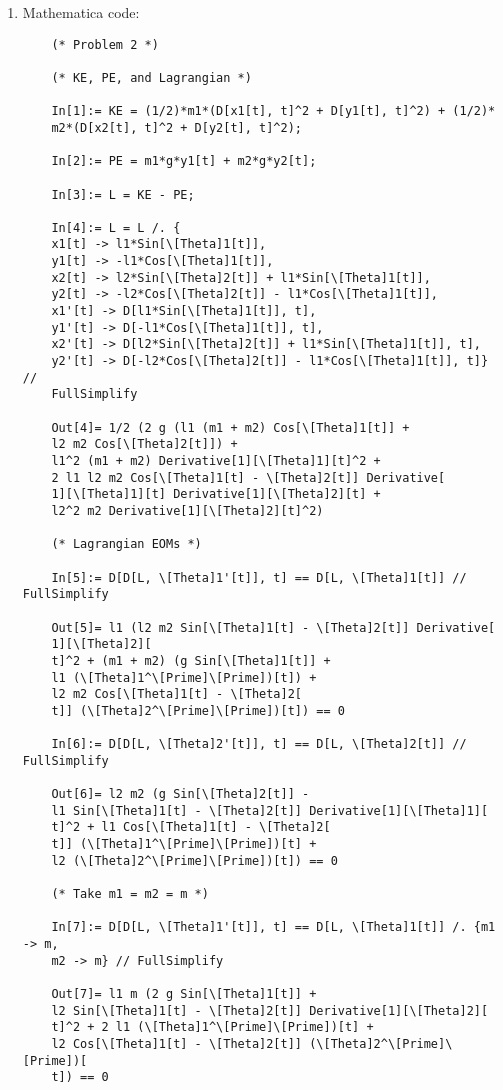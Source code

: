 \documentclass{article}
\theoremstyle{definition}
\begin{document}
\begin{enumerate}[label=(\alph*)]
	\item Mathematica code:
	\begin{lstlisting}
	(* Problem 2 *)
	
	(* KE, PE, and Lagrangian *)
	
	In[1]:= KE = (1/2)*m1*(D[x1[t], t]^2 + D[y1[t], t]^2) + (1/2)*
	m2*(D[x2[t], t]^2 + D[y2[t], t]^2);
	
	In[2]:= PE = m1*g*y1[t] + m2*g*y2[t];
	
	In[3]:= L = KE - PE;
	
	In[4]:= L = L /. {
	x1[t] -> l1*Sin[\[Theta]1[t]],
	y1[t] -> -l1*Cos[\[Theta]1[t]],
	x2[t] -> l2*Sin[\[Theta]2[t]] + l1*Sin[\[Theta]1[t]],
	y2[t] -> -l2*Cos[\[Theta]2[t]] - l1*Cos[\[Theta]1[t]],
	x1'[t] -> D[l1*Sin[\[Theta]1[t]], t],
	y1'[t] -> D[-l1*Cos[\[Theta]1[t]], t],
	x2'[t] -> D[l2*Sin[\[Theta]2[t]] + l1*Sin[\[Theta]1[t]], t],
	y2'[t] -> D[-l2*Cos[\[Theta]2[t]] - l1*Cos[\[Theta]1[t]], t]} // 
	FullSimplify
	
	Out[4]= 1/2 (2 g (l1 (m1 + m2) Cos[\[Theta]1[t]] + 
	l2 m2 Cos[\[Theta]2[t]]) + 
	l1^2 (m1 + m2) Derivative[1][\[Theta]1][t]^2 + 
	2 l1 l2 m2 Cos[\[Theta]1[t] - \[Theta]2[t]] Derivative[
	1][\[Theta]1][t] Derivative[1][\[Theta]2][t] + 
	l2^2 m2 Derivative[1][\[Theta]2][t]^2)
	
	(* Lagrangian EOMs *)
	
	In[5]:= D[D[L, \[Theta]1'[t]], t] == D[L, \[Theta]1[t]] // FullSimplify
	
	Out[5]= l1 (l2 m2 Sin[\[Theta]1[t] - \[Theta]2[t]] Derivative[
	1][\[Theta]2][
	t]^2 + (m1 + m2) (g Sin[\[Theta]1[t]] + 
	l1 (\[Theta]1^\[Prime]\[Prime])[t]) + 
	l2 m2 Cos[\[Theta]1[t] - \[Theta]2[
	t]] (\[Theta]2^\[Prime]\[Prime])[t]) == 0
	
	In[6]:= D[D[L, \[Theta]2'[t]], t] == D[L, \[Theta]2[t]] // FullSimplify
	
	Out[6]= l2 m2 (g Sin[\[Theta]2[t]] - 
	l1 Sin[\[Theta]1[t] - \[Theta]2[t]] Derivative[1][\[Theta]1][
	t]^2 + l1 Cos[\[Theta]1[t] - \[Theta]2[
	t]] (\[Theta]1^\[Prime]\[Prime])[t] + 
	l2 (\[Theta]2^\[Prime]\[Prime])[t]) == 0
	
	(* Take m1 = m2 = m *)
	
	In[7]:= D[D[L, \[Theta]1'[t]], t] == D[L, \[Theta]1[t]] /. {m1 -> m, 
	m2 -> m} // FullSimplify
	
	Out[7]= l1 m (2 g Sin[\[Theta]1[t]] + 
	l2 Sin[\[Theta]1[t] - \[Theta]2[t]] Derivative[1][\[Theta]2][
	t]^2 + 2 l1 (\[Theta]1^\[Prime]\[Prime])[t] + 
	l2 Cos[\[Theta]1[t] - \[Theta]2[t]] (\[Theta]2^\[Prime]\[Prime])[
	t]) == 0
	

\end{lstlisting}
\end{enumerate}
\end{document}
